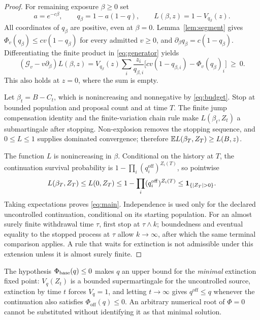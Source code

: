 \begin{proof}
For remaining exposure $\beta\ge0$ set
\[
 a=e^{-c\beta},\qquad q_\beta=1-a(1-q),\qquad L(\beta,z)=1-V_{q_\beta}(z).
\]
All coordinates of $q_\beta$ are positive, even at $\beta=0$.
Lemma~\ref{lem:segment} gives $\Phi_v(q_\beta)\le cv(1-q_\beta)$ for every
admitted $v\ge0$, and $\partial_\beta q_\beta=c(1-q_\beta)$. Differentiating the
finite product in \eqref{eq:generator} yields
\begin{equation}\label{eq:barrier}
 (\mathcal G_v-v\partial_\beta)L(\beta,z)
 =V_{q_\beta}(z)\sum_i\frac{z_i}{q_{\beta,i}}
      \bigl[cv(1-q_{\beta,i})-\Phi_v(q_\beta)_i\bigr]\ \ge\ 0 .
\end{equation}
This also holds at $z=0$, where the sum is empty.

Let $\beta_t=B-C_t$, which is nonincreasing and nonnegative by
\eqref{eq:budget}. Stop at bounded population and proposal count and at time
$T$. The finite jump compensation identity and the finite-variation chain rule
make $L(\beta_t,Z_t)$ a submartingale after stopping. Non-explosion removes the
stopping sequence, and $0\le L\le1$ supplies dominated convergence; therefore
$\mathbb E L(\beta_T,Z_T)\ge L(B,z)$.

The function $L$ is nonincreasing in $\beta$. Conditional on the history at $T$,
the continuation survival probability is
$1-\prod_i(q_i^{\mathrm{off}})^{Z_i(T)}$, so pointwise
\[
 L(\beta_T,Z_T)\le L(0,Z_T)\le1-\prod_i(q_i^{\mathrm{off}})^{Z_i(T)}
 \le\one_{\{|Z_T|>0\}}.
\]
Taking expectations proves \eqref{eq:main}. Independence is used only for the
declared uncontrolled continuation, conditional on its starting population. For
an almost surely finite withdrawal time $\tau$, first stop at $\tau\wedge k$;
boundedness and eventual equality to the stopped process at $\tau$ allow
$k\to\infty$, after which the same terminal comparison applies. A rule that
waits for extinction is not admissible under this extension unless it is almost
surely finite.
\end{proof}

\begin{remark}
The hypothesis $\Phi_{\mathrm{base}}(q)\le0$ makes $q$ an upper bound for the \emph{minimal}
extinction fixed point: $V_q(Z_t)$ is a bounded supermartingale for the
uncontrolled source, extinction by time $t$ forces $V_q=1$, and letting
$t\to\infty$ gives $q^{\mathrm{off}}\le q$ whenever the continuation also
satisfies $\Phi_{\mathrm{off}}(q)\le0$. An arbitrary numerical root of
$\Phi=0$ cannot be substituted without identifying it as that minimal solution.
\end{remark}

